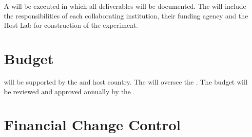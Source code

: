 A  will be executed in which all deliverables will be
documented. The  will include the responsibilities of each
collaborating institution, their funding agency and the Host Lab for 
construction of the experiment.

\section{Budget}
\label{sec:fdsp-coord-budget}

  will be supported by the
 and host country. The  will oversee
the .  The  budget will be reviewed and
approved annually by the .

\section{Financial Change Control}
\label{sec:fdsp-coord-financialchange}

